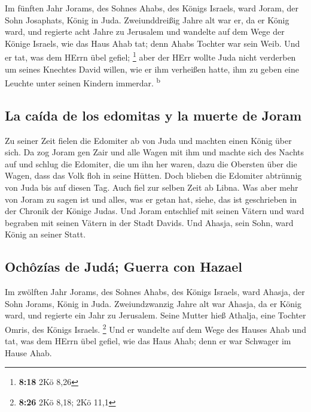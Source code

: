  Im fünften Jahr Jorams, des Sohnes Ahabs, des Königs
Israels, ward Joram, der Sohn Josaphats, König in Juda. 
Zweiunddreißig Jahre alt war er, da er König ward, und regierte acht
Jahre zu Jerusalem  und wandelte auf dem Wege der Könige
Israels, wie das Haus Ahab tat; denn Ahabs Tochter war sein Weib. Und er
tat, was dem HErrn übel gefiel; \footnote{\textbf{8:18} 2Kö 8,26}
 aber der HErr wollte Juda nicht verderben um seines
Knechtes David willen, wie er ihm verheißen hatte, ihm zu geben eine
Leuchte unter seinen Kindern immerdar. \textsuperscript{b}

\hypertarget{la-cauxedda-de-los-edomitas-y-la-muerte-de-joram}{%
\subsection{La caída de los edomitas y la muerte de
Joram}\label{la-cauxedda-de-los-edomitas-y-la-muerte-de-joram}}

 Zu seiner Zeit fielen die Edomiter ab von Juda und
machten einen König über sich.  Da zog Joram gen Zair und
alle Wagen mit ihm und machte sich des Nachts auf und schlug die
Edomiter, die um ihn her waren, dazu die Obersten über die Wagen, dass
das Volk floh in seine Hütten.  Doch blieben die Edomiter
abtrünnig von Juda bis auf diesen Tag. Auch fiel zur selben Zeit ab
Libna.  Was aber mehr von Joram zu sagen ist und alles,
was er getan hat, siehe, das ist geschrieben in der Chronik der Könige
Judas.  Und Joram entschlief mit seinen Vätern und ward
begraben mit seinen Vätern in der Stadt Davids. Und Ahasja, sein Sohn,
ward König an seiner Statt.

\hypertarget{ochuxf4zuxedas-de-juduxe1-guerra-con-hazael}{%
\subsection{Ochôzías de Judá; Guerra con
Hazael}\label{ochuxf4zuxedas-de-juduxe1-guerra-con-hazael}}

 Im zwölften Jahr Jorams, des Sohnes Ahabs, des Königs
Israels, ward Ahasja, der Sohn Jorams, König in Juda. 
Zweiundzwanzig Jahre alt war Ahasja, da er König ward, und regierte ein
Jahr zu Jerusalem. Seine Mutter hieß Athalja, eine Tochter Omris, des
Königs Israels. \footnote{\textbf{8:26} 2Kö 8,18; 2Kö 11,1}
 Und er wandelte auf dem Wege des Hauses Ahab und tat,
was dem HErrn übel gefiel, wie das Haus Ahab; denn er war Schwager im
Hause Ahab.


